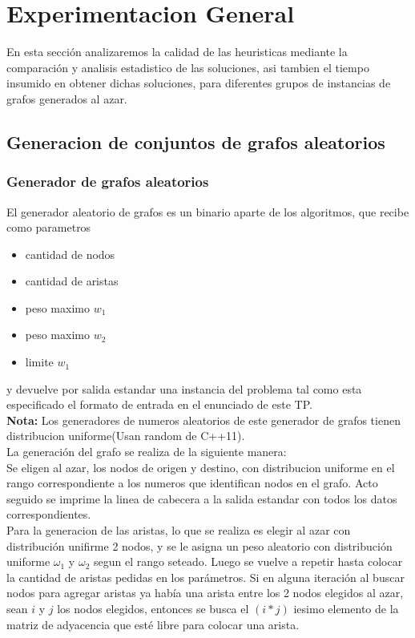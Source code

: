 \section{Experimentacion General}
En esta secci\'on analizaremos la calidad de las heuristicas mediante la comparaci\'on y analisis estadistico de las soluciones, asi tambien el tiempo insumido en obtener dichas soluciones, para diferentes grupos de instancias de grafos generados al azar.

\subsection{Generacion de conjuntos de grafos aleatorios}

\subsubsection{Generador de grafos aleatorios}
El generador aleatorio de grafos es un binario aparte de los algoritmos, que recibe como parametros
\begin{itemize}
\item cantidad de nodos
\item cantidad de aristas
\item peso maximo $w_1$
\item peso maximo $w_2$
\item limite $w_1$
\end{itemize}
y devuelve por salida estandar una instancia del problema tal como esta especificado el formato de entrada en el enunciado de este TP.
\\ \textbf{Nota: }Los generadores de numeros aleatorios de este generador de grafos tienen distribucion uniforme(Usan random de C++11).
\\ La generaci\'on del grafo se realiza de la siguiente manera:
\\ Se eligen al azar, los nodos de origen y destino, con distribucion uniforme en el rango correspondiente a los numeros que identifican nodos en el grafo. Acto seguido se imprime la linea de cabecera a la salida estandar con todos los datos correspondientes.
\\ Para la generacion de las aristas, lo que se realiza es elegir al azar con distribuci\'on unifirme 2 nodos, y se le asigna un peso aleatorio con distribuci\'on uniforme $\omega_1$ y $\omega_2$ segun el rango seteado. Luego se vuelve a repetir hasta colocar la cantidad de aristas pedidas en los par\'ametros. Si en alguna iteraci\'on al buscar nodos para agregar aristas ya hab\'ia una arista entre los 2 nodos elegidos al azar, sean $i$ y $j$ los nodos elegidos, entonces se busca el $(i * j)$ iesimo elemento de la matriz de adyacencia que est\'e libre para colocar una arista.

